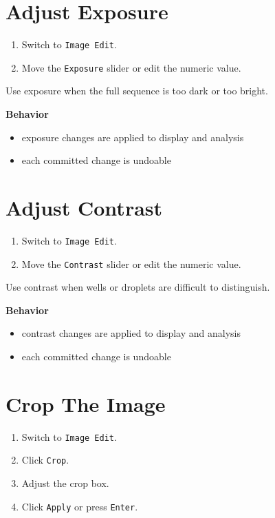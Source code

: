\documentclass[
  9pt,
  letterpaper,
  oneside,
  open=any,
  DIV=15,
  parskip=half-,
  headings=big,
  numbers=noenddot
]{scrbook}
\newcommand{\manuallead}[1]{%
  \vspace{0.15em}%
  {\sffamily\bfseries\color{ManualBlue}#1}\par\nobreak\vspace{0.05em}%
}
\begin{document}
\section{Adjust Exposure}

\begin{enumerate}[leftmargin=*,itemsep=0.35em,topsep=0.4em]
\item Switch to \texttt{Image Edit}.
\item Move the \texttt{Exposure} slider or edit the numeric value.
\end{enumerate}

Use exposure when the full sequence is too dark or too bright.


\manuallead{Behavior}

\begin{itemize}[leftmargin=*,itemsep=0.35em,topsep=0.4em]
\item exposure changes are applied to display and analysis
\item each committed change is undoable
\end{itemize}

\section{Adjust Contrast}

\begin{enumerate}[leftmargin=*,itemsep=0.35em,topsep=0.4em]
\item Switch to \texttt{Image Edit}.
\item Move the \texttt{Contrast} slider or edit the numeric value.
\end{enumerate}

Use contrast when wells or droplets are difficult to distinguish.


\manuallead{Behavior}

\begin{itemize}[leftmargin=*,itemsep=0.35em,topsep=0.4em]
\item contrast changes are applied to display and analysis
\item each committed change is undoable
\end{itemize}

\section{Crop The Image}

\begin{enumerate}[leftmargin=*,itemsep=0.35em,topsep=0.4em]
\item Switch to \texttt{Image Edit}.
\item Click \texttt{Crop}.
\item Adjust the crop box.
\item Click \texttt{Apply} or press \texttt{Enter}.
\end{enumerate}
\end{document}
